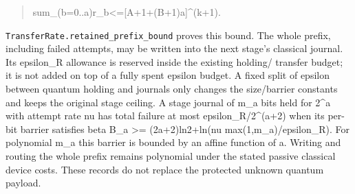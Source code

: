 \documentclass[
]{article}
\begin{document}
\begin{quote}\small\ttfamily\raggedright\setlength{\parskip}{0pt}
\noindent s\allowbreak{}u\allowbreak{}m\allowbreak{}\_\allowbreak{}(\allowbreak{}b\allowbreak{}=\allowbreak{}0\allowbreak{}.\allowbreak{}.\allowbreak{}a\allowbreak{})\allowbreak{}\hspace*{0.525em}\allowbreak{}r\allowbreak{}\_\allowbreak{}b\allowbreak{}\hspace*{0.525em}\allowbreak{}<\allowbreak{}=\allowbreak{}\hspace*{0.525em}\allowbreak{}[\allowbreak{}A\allowbreak{}+\allowbreak{}1\allowbreak{}+\allowbreak{}(\allowbreak{}B\allowbreak{}+\allowbreak{}1\allowbreak{})\allowbreak{}a\allowbreak{}]\allowbreak{}\^{}\allowbreak{}(\allowbreak{}k\allowbreak{}+\allowbreak{}1\allowbreak{})\allowbreak{}.\par
\end{quote}

\texttt{T\allowbreak{}r\allowbreak{}a\allowbreak{}n\allowbreak{}s\allowbreak{}f\allowbreak{}e\allowbreak{}r\allowbreak{}R\allowbreak{}a\allowbreak{}t\allowbreak{}e\allowbreak{}.\allowbreak{}r\allowbreak{}e\allowbreak{}t\allowbreak{}a\allowbreak{}i\allowbreak{}n\allowbreak{}e\allowbreak{}d\allowbreak{}\_\allowbreak{}p\allowbreak{}r\allowbreak{}e\allowbreak{}f\allowbreak{}i\allowbreak{}x\allowbreak{}\_\allowbreak{}b\allowbreak{}o\allowbreak{}u\allowbreak{}n\allowbreak{}d}
proves this bound. The whole prefix, including failed attempts, may be
written into the next stage's classical journal. Its epsilon\_R
allowance is reserved inside the existing holding/ transfer budget; it
is not added on top of a fully spent epsilon budget. A fixed split of
epsilon between quantum holding and journals only changes the
size/barrier constants and keeps the original stage ceiling. A stage
journal of m\_a bits held for 2\^{}a with attempt rate nu has total
failure at most
e\allowbreak{}p\allowbreak{}s\allowbreak{}i\allowbreak{}l\allowbreak{}o\allowbreak{}n\allowbreak{}\_\allowbreak{}R\allowbreak{}/\allowbreak{}2\allowbreak{}\^{}\allowbreak{}(\allowbreak{}a\allowbreak{}+\allowbreak{}2\allowbreak{})
when its per-bit barrier satisfies beta B\_a \textgreater=
(2a+2)ln2+ln(nu
m\allowbreak{}a\allowbreak{}x\allowbreak{}(\allowbreak{}1\allowbreak{},\allowbreak{}m\allowbreak{}\_\allowbreak{}a\allowbreak{})\allowbreak{}/\allowbreak{}e\allowbreak{}p\allowbreak{}s\allowbreak{}i\allowbreak{}l\allowbreak{}o\allowbreak{}n\allowbreak{}\_\allowbreak{}R\allowbreak{})\allowbreak{}.
For polynomial m\_a this barrier is bounded by an affine function of a.
Writing and routing the whole prefix remains polynomial under the stated
passive classical device costs. These records do not replace the
protected unknown quantum payload.
\end{document}
